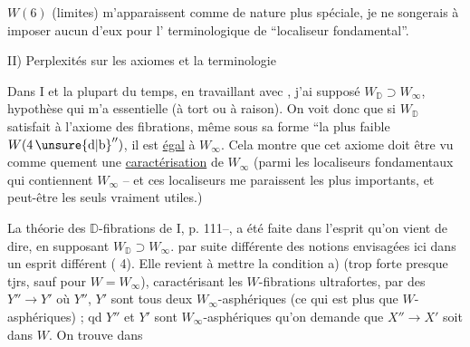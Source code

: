 
$W(6)$ (limites) m'apparaissent comme de nature plus spéciale, je ne songerais à imposer aucun d'eux pour l'  terminologique de ``localiseur fondamental''.

II) Perplexités sur les axiomes et la terminologie


Dans I et la plupart du temps, en travaillant avec , j'ai supposé $\boxed{W_{\mathbb D}\supset W_\infty}$,  hypothèse qui m'a  essentielle (à tort ou à raison).
 On voit donc que si $W_{\mathbb D}$ satisfait à l'axiome des fibrations, même sous sa forme ``la plus faible $W(4\,\unsure{\mathrm d|\mathrm b}'')$, il est \uline{égal} à $W_\infty$. Cela montre   que cet axiome doit être vu comme quement une \uline{caractérisation} de $W_\infty$ (parmi les localiseurs fondamentaux qui contiennent $W_\infty$ -- et ces localiseurs me paraissent les plus importants, et peut-être les seuls vraiment utiles.)

La théorie des $\mathbb D$-fibrations de I, p. 111--, a été faite dans l'esprit qu'on vient de dire, en supposant $W_{\mathbb D}\supset W_\infty$.     par suite différente des notions envisagées  ici dans un esprit différent ( 4). Elle revient à mettre la condition a) (trop forte presque tjrs,  sauf pour $W=W_\infty$), caractérisant les $W$-fibrations ultrafortes, par des $Y''\longrightarrow Y'$ où $Y''$, $Y'$ sont tous deux $W_\infty$-asphériques (ce qui est plus \uline{} que $W$-asphériques) ;  qd $Y''$ et $Y'$ sont $W_\infty$-asphériques  qu'on demande que  $X''\longrightarrow X'$ soit  dans $W$. On trouve dans

